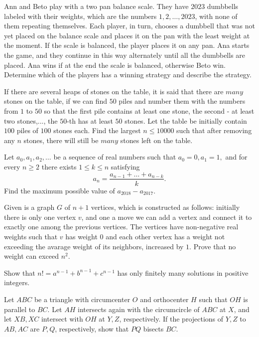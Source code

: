 \documentclass[11pt]{scrartcl}
\begin{document}
\begin{problem}[6819074419096549446]
Ann and Beto play with a two pan balance scale. They have $2023$ dumbbells labeled with their weights, which are the numbers $1, 2, \dots, 2023$, with none of them repeating themselves. Each player, in turn, chooses a dumbbell that was not yet placed on the balance scale and places it on the pan with the least weight at the moment. If the scale is balanced, the player places it on any pan. Ana starts the game, and they continue in this way alternately until all the dumbbells are placed. Ana wins if at the end the scale is balanced, otherwise Beto win. Determine which of the players has a winning strategy and describe the strategy.
\end{problem}
\begin{problem}[6955756846906975678]
If there are several heaps of stones on the table, it is said that there are $\textit{many}$ stones on the table, if we can find $50$ piles and number them with the numbers from $1$ to $50$ so that the first pile contains at least one stone, the second - at least two stones,..., the $50$-th has at least $50$ stones. Let the table be initially contain $100$ piles of $100$ stones each. Find the largest $n \leq 10 000$ such that after removing any $n$ stones, there will still be $\textit{many}$ stones left on the table.
\end{problem}
\begin{problem}[3923745101517032298]
	Let $a_0,a_1,a_2,\dots $ be a sequence of real numbers such that $a_0=0, a_1=1,$ and for every $n\geq 2$ there exists $1 \leq k \leq n$ satisfying\[ a_n=\frac{a_{n-1}+\dots + a_{n-k}}{k}. \]Find the maximum possible value of $a_{2018}-a_{2017}$.
\end{problem}
\begin{problem}[493735785757154]
	Given is a graph $G$ of $n+1$ vertices, which is constructed as follows: initially there is only one vertex $v$, and one a move we can add a vertex and connect it to exactly one among the previous vertices. The vertices have non-negative real weights such that $v$ has weight $0$ and each other vertex has a weight not exceeding the avarage weight of its neighbors, increased by $1$. Prove that no weight can exceed $n^2$.
\end{problem}
\begin{problem}[599825051147866097]
Show that $n!=a^{n-1}+b^{n-1}+c^{n-1}$ has only finitely many solutions in positive integers.
\end{problem}
\begin{problem}[1427062131747349943]
Let $ABC$ be a triangle with circumcenter $O$ and orthocenter $H$ such that $OH$ is parallel to $BC$. Let $AH$ intersects again with the circumcircle of $ABC$ at $X$, and let $XB, XC$ intersect with $OH$ at $Y, Z$, respectively. If the projections of $Y,Z$ to $AB,AC$ are $P,Q$, respectively, show that $PQ$ bisects $BC$.
\end{problem}
\end{document}
